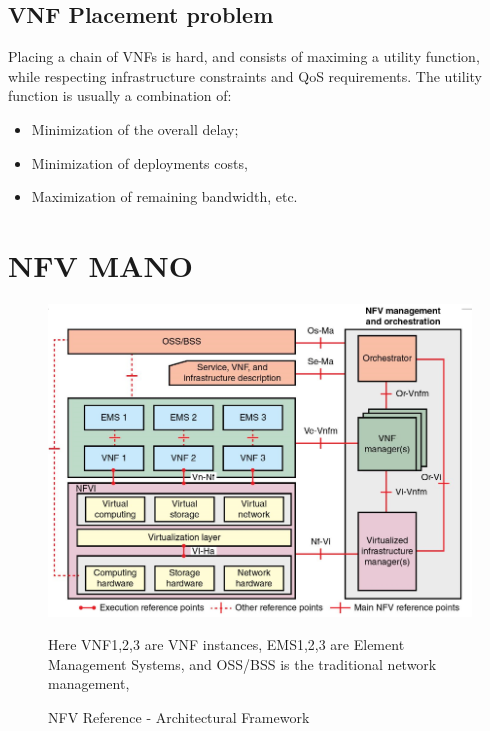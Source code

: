 \subsection{VNF Placement problem}
Placing a chain of VNFs is hard, and consists of maximing a utility function, while respecting infrastructure constraints and QoS requirements. The utility function is usually a combination of:
\begin{itemize}
   \item Minimization of the overall delay;
   \item Minimization of deployments costs,
   \item Maximization of remaining bandwidth, etc.
\end{itemize}

\section{NFV MANO}

\begin{figure}[htbp]
   \centering
   \includegraphics{images/NFV_mano.png}
   \caption{NFV Reference - Architectural Framework}
   Here VNF1,2,3 are VNF instances, EMS1,2,3 are Element Management Systems, and OSS/BSS is the traditional network management,
   \label{fig:NFV_mano}
\end{figure}

